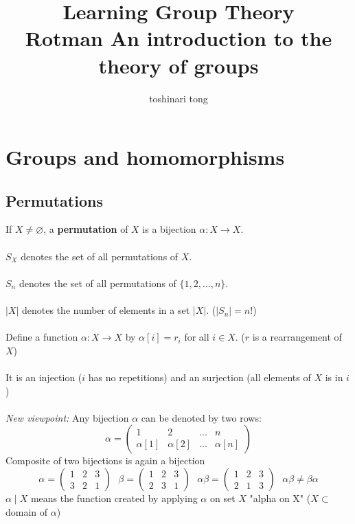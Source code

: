 \documentclass{article}
\title{Learning Group Theory\\Rotman An introduction to the theory of groups}
\author{toshinari tong}
\begin{document}
\maketitle

\section{Groups and homomorphisms}
\null
\subsection{Permutations}
If \(X\neq\varnothing\), a \textbf{permutation} of \(X\) is a bijection \(\alpha :X\rightarrow X\).\\\\
\(S_X\) denotes the set of all permutations of \(X\).\\\\
\(S_n\) denotes the set of all permutations of \(\{1,2,...,n\}\).\\\\
\(|X|\) denotes the number of elements in a set \(|X|\). (\(|S_n|=n!\))\\\\
Define a function \(\alpha :X\rightarrow X\) by \(\alpha[i]=r_i\) for all \(i\in X\). (\(r \) is a rearrangement of \(X\))\\\\
\null\qquad It is an injection (\(i\) has no repetitions) and an surjection (all elements of \(X\) is in \(i\))\\\\
\textit{New viewpoint:} Any bijection \(\alpha\) can be denoted by two rows:
\[\alpha=\begin{pmatrix}1 & 2 & ... & n\\\alpha[1] & \alpha[2] & ... & \alpha[n]\end{pmatrix}\]
Composite of two bijections is again a bijection
\[\alpha=\begin{pmatrix}1 & 2 & 3\\3 & 2 & 1\end{pmatrix}\,\,\,\,\beta=\begin{pmatrix}1 & 2 & 3\\2 & 3 & 1\end{pmatrix}\,\,\,\,\alpha\beta=\begin{pmatrix}1 & 2 & 3\\2 & 1 & 3\end{pmatrix}\,\,\,\,\alpha\beta\neq\beta\alpha\]
\(\alpha\mid X\) means the function created by applying \(\alpha\) on set \(X\) "alpha on X" (\(X\subset\) domain of \(\alpha\))
\end{document}
